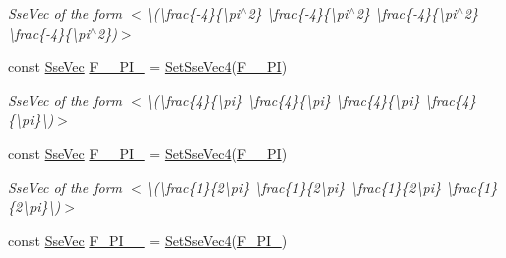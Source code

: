 \begin{DoxyCompactItemize}
\begin{DoxyCompactList}\small\item\em Sse\+Vec of the form $<$\textbackslash{}(\textbackslash{}frac\{-\/4\}\{\textbackslash{}pi$^\wedge$2\} \textbackslash{}frac\{-\/4\}\{\textbackslash{}pi$^\wedge$2\} \textbackslash{}frac\{-\/4\}\{\textbackslash{}pi$^\wedge$2\} \textbackslash{}frac\{-\/4\}\{\textbackslash{}pi$^\wedge$2\})$>$ \end{DoxyCompactList}\item 
\hypertarget{namespacegofxmath_a81dae68cc57b86fa3876cf0edc4456f4}{}const \hyperlink{namespacegofxmath_a634570ddcd2496053ee966227080e02f}{Sse\+Vec} \hyperlink{namespacegofxmath_a81dae68cc57b86fa3876cf0edc4456f4}{F\+\_\+\_\+\+P\+I\+\_} = \hyperlink{namespacegofxmath_a5c69ea49b97ced58947fec384517442d}{Set\+Sse\+Vec4}(\hyperlink{group___scalar_math_consts_ga17543086409760281a83ba571b38eda4}{F\+\_\+\_\+\+P\+I})\label{namespacegofxmath_a81dae68cc57b86fa3876cf0edc4456f4}

\begin{DoxyCompactList}\small\item\em Sse\+Vec of the form $<$\textbackslash{}(\textbackslash{}frac\{4\}\{\textbackslash{}pi\} \textbackslash{}frac\{4\}\{\textbackslash{}pi\} \textbackslash{}frac\{4\}\{\textbackslash{}pi\} \textbackslash{}frac\{4\}\{\textbackslash{}pi\}\textbackslash{})$>$ \end{DoxyCompactList}\item 
\hypertarget{namespacegofxmath_acb8bd518963c95a13b39ef68bbfa14af}{}const \hyperlink{namespacegofxmath_a634570ddcd2496053ee966227080e02f}{Sse\+Vec} \hyperlink{namespacegofxmath_acb8bd518963c95a13b39ef68bbfa14af}{F\+\_\+\_\+P\+I\+\_} = \hyperlink{namespacegofxmath_a5c69ea49b97ced58947fec384517442d}{Set\+Sse\+Vec4}(\hyperlink{group___scalar_math_consts_ga1e7d6dc0fa11f4284b6f0eaa5b08a351}{F\+\_\+\_\+P\+I})\label{namespacegofxmath_acb8bd518963c95a13b39ef68bbfa14af}

\begin{DoxyCompactList}\small\item\em Sse\+Vec of the form $<$\textbackslash{}(\textbackslash{}frac\{1\}\{2\textbackslash{}pi\} \textbackslash{}frac\{1\}\{2\textbackslash{}pi\} \textbackslash{}frac\{1\}\{2\textbackslash{}pi\} \textbackslash{}frac\{1\}\{2\textbackslash{}pi\}\textbackslash{})$>$ \end{DoxyCompactList}\item 
\hypertarget{namespacegofxmath_aaea636fb8f936987307f5b28ca6fcd10}{}const \hyperlink{namespacegofxmath_a634570ddcd2496053ee966227080e02f}{Sse\+Vec} \hyperlink{namespacegofxmath_aaea636fb8f936987307f5b28ca6fcd10}{F\+\_\+\+P\+I\+\_\+\_} = \hyperlink{namespacegofxmath_a5c69ea49b97ced58947fec384517442d}{Set\+Sse\+Vec4}(\hyperlink{group___scalar_math_consts_ga946e6dc7aaa53bbc0d3b6d433891c7a8}{F\+\_\+\+P\+I\+\_})\label{namespacegofxmath_aaea636fb8f936987307f5b28ca6fcd10}


\end{DoxyCompactItemize}
